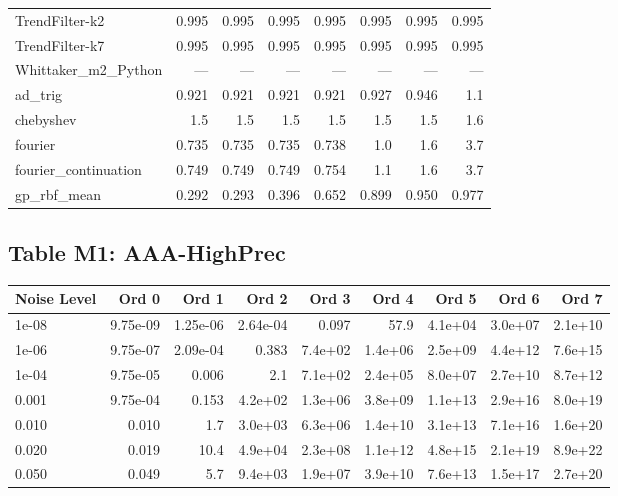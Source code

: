 \documentclass[10pt]{article}
\begin{document}
\begin{longtable}{lrrrrrrr}
TrendFilter-k2 & 0.995 & 0.995 & 0.995 & 0.995 & 0.995 & 0.995 & 0.995 \\
TrendFilter-k7 & 0.995 & 0.995 & 0.995 & 0.995 & 0.995 & 0.995 & 0.995 \\
Whittaker\_m2\_Python & --- & --- & --- & --- & --- & --- & --- \\
ad\_trig & 0.921 & 0.921 & 0.921 & 0.921 & 0.927 & 0.946 & 1.1 \\
chebyshev & 1.5 & 1.5 & 1.5 & 1.5 & 1.5 & 1.5 & 1.6 \\
fourier & 0.735 & 0.735 & 0.735 & 0.738 & 1.0 & 1.6 & 3.7 \\
fourier\_continuation & 0.749 & 0.749 & 0.749 & 0.754 & 1.1 & 1.6 & 3.7 \\
gp\_rbf\_mean & 0.292 & 0.293 & 0.396 & 0.652 & 0.899 & 0.950 & 0.977 \\
\bottomrule
\end{longtable}

\clearpage



\subsection*{Table M1: AAA-HighPrec}

\begin{longtable}{lrrrrrrrr}
\toprule
\textbf{Noise Level} & \textbf{Ord 0} & \textbf{Ord 1} & \textbf{Ord 2} & \textbf{Ord 3} & \textbf{Ord 4} & \textbf{Ord 5} & \textbf{Ord 6} & \textbf{Ord 7} \\
\midrule
\endhead
1e-08 & 9.75e-09 & 1.25e-06 & 2.64e-04 & 0.097 & 57.9 & 4.1e+04 & 3.0e+07 & 2.1e+10 \\
1e-06 & 9.75e-07 & 2.09e-04 & 0.383 & 7.4e+02 & 1.4e+06 & 2.5e+09 & 4.4e+12 & 7.6e+15 \\
1e-04 & 9.75e-05 & 0.006 & 2.1 & 7.1e+02 & 2.4e+05 & 8.0e+07 & 2.7e+10 & 8.7e+12 \\
0.001 & 9.75e-04 & 0.153 & 4.2e+02 & 1.3e+06 & 3.8e+09 & 1.1e+13 & 2.9e+16 & 8.0e+19 \\
0.010 & 0.010 & 1.7 & 3.0e+03 & 6.3e+06 & 1.4e+10 & 3.1e+13 & 7.1e+16 & 1.6e+20 \\
0.020 & 0.019 & 10.4 & 4.9e+04 & 2.3e+08 & 1.1e+12 & 4.8e+15 & 2.1e+19 & 8.9e+22 \\
0.050 & 0.049 & 5.7 & 9.4e+03 & 1.9e+07 & 3.9e+10 & 7.6e+13 & 1.5e+17 & 2.7e+20 \\
\bottomrule
\end{longtable}
\end{document}
